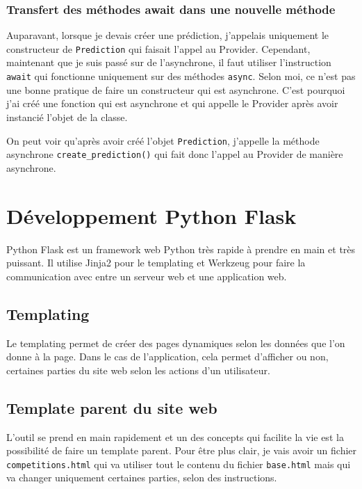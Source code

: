 \documentclass[a4paper,14pt]{extarticle}
\begin{document}
{\subsubsection{Transfert des méthodes await dans une nouvelle méthode}

Auparavant, lorsque je devais créer une prédiction, j'appelais uniquement le constructeur de \texttt{Prediction} qui faisait l'appel au Provider. Cependant, maintenant que je suis passé sur de l'asynchrone, il faut utiliser l'instruction \texttt{await} qui fonctionne uniquement sur des méthodes \texttt{async}. Selon moi, ce n'est pas une bonne pratique de faire un constructeur qui est asynchrone. C'est pourquoi j'ai créé une fonction qui est asynchrone et qui appelle le Provider après avoir instancié l'objet de la classe.


On peut voir qu'après avoir créé l'objet \texttt{Prediction}, j'appelle la méthode asynchrone \texttt{create\_prediction()} qui fait donc l'appel au Provider de manière asynchrone.

\newpage

\section{Développement Python Flask}

Python Flask est un framework web Python très rapide à prendre en main et très puissant. Il utilise Jinja2 pour le templating et Werkzeug pour faire la communication avec entre un serveur web et une application web. 

\subsection{Templating}

Le templating permet de créer des pages dynamiques selon les données que l'on donne à la page. Dans le cas de l'application, cela permet d'afficher ou non, certaines parties du site web selon les actions d'un utilisateur.

\subsection{Template parent du site web}

L'outil se prend en main rapidement et un des concepts qui facilite la vie est la possibilité de faire un template parent. Pour être plus clair, je vais avoir un fichier \texttt{competitions.html} qui va utiliser tout le contenu du fichier \texttt{base.html} mais qui va changer uniquement certaines parties, selon des instructions.

}
\end{document}
